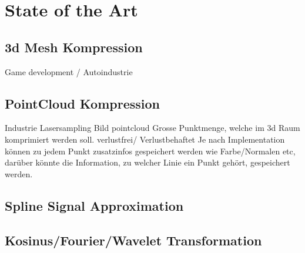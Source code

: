 \section{State of the Art}

\subsection{3d Mesh Kompression}
Game development / Autoindustrie

\subsection{PointCloud Kompression}
Industrie Lasersampling
Bild pointcloud
Grosse Punktmenge, welche im 3d Raum komprimiert werden soll.
verlustfrei/ Verlustbehaftet
Je nach Implementation können zu jedem Punkt zusatzinfos gespeichert werden wie Farbe/Normalen etc, darüber könnte die Information, zu welcher Linie ein Punkt gehört, gespeichert werden.

\subsection{Spline Signal Approximation}

\subsection{Kosinus/Fourier/Wavelet Transformation}
